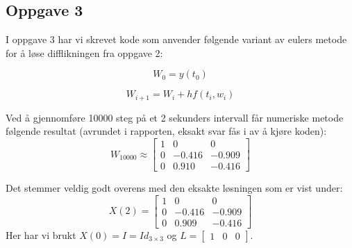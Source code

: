 \subsection{Oppgave 3}

I oppgave 3 har vi skrevet kode som anvender følgende variant av eulers metode for å løse difflikningen fra oppgave 2:

\begin{equation}
    W_0 = y(t_0)
\end{equation}

\begin{equation}
    W_{i+1} = W_i + hf(t_i, w_i)
\end{equation}

Ved å gjennomføre 10000 steg på et 2 sekunders intervall får numeriske metode følgende resultat (avrundet i rapporten, eksakt svar fås i av å kjøre koden):\newline
\begin{equation}
W_{10000} \approx    
\begin{bmatrix}
1 & 0 & 0 \\
0 & -0.416 & -0.909 \\
0 & 0.910 & -0.416
\end{bmatrix}
\end{equation}

Det stemmer veldig godt overens med den eksakte løsningen som er vist under:\newline
\begin{equation}
X(2) =     
\begin{bmatrix}
1 & 0 & 0 \\
0 & -0.416 & -0.909 \\
0 & 0.909 & -0.416
\end{bmatrix}
\end{equation}
Her har vi brukt $X(0)=I=Id_{3\times3}$ og $L=\begin{bmatrix}1&0&0\end{bmatrix}.$